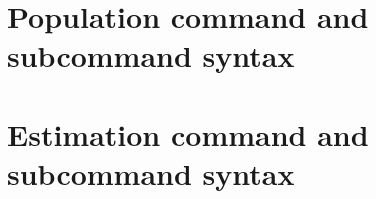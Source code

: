 \section{Population command and subcommand syntax\label{sec:population-syntax}}

\subsection{}
 

\subsection{}
 

\subsection{}
 

\subsection{}
 

\subsection{}
 

\subsection{}
 

\subsection{}


\subsection{}
 

\section{Estimation command and subcommand syntax\label{sec:estimation-syntax}}

